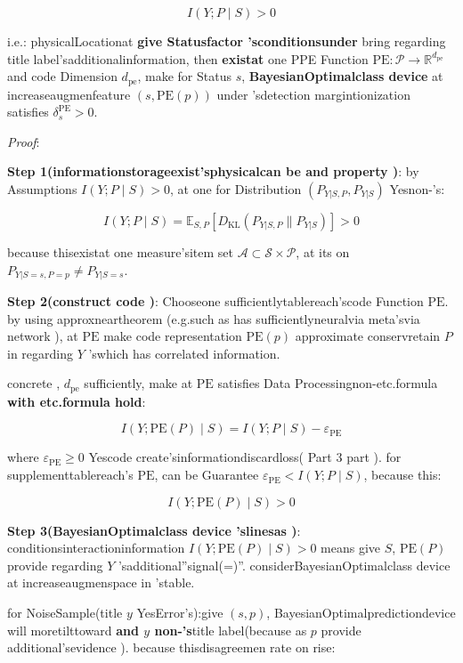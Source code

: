 \documentclass[
  12pt,
]{article}
\begin{document}
\[\boxed{I(Y; P \mid S) > 0}\]

i.e.: physicalLocationat \textbf{give Statusfactor 'sconditionsunder }bring regarding title label'sadditionalinformation, then \textbf{existat }one 
PPE Function \(\text{PE}: \mathcal{P} \to \mathbb{R}^{d_{\text{pe}}}\)
and code Dimension \(d_{\text{pe}}\), make for Status
\(s\), \textbf{BayesianOptimalclass device }at increaseaugmenfeature \((s, \text{PE}(p))\)
under 'sdetection margintionization satisfies  \(\delta_s^{\text{PE}} > 0\). 

\emph{Proof}: 

\textbf{Step 1(informationstorageexist'sphysicalcan be and property )}: by Assumptions
\(I(Y; P \mid S) > 0\), at one for Distribution \((P_{Y|S,P}, P_{Y|S})\)
Yesnon-'s: 

\[I(Y; P \mid S) = \mathbb{E}_{S, P}\left[D_{\text{KL}}(P_{Y|S,P} \| P_{Y|S})\right] > 0\]

because thisexistat one  measure'sitem set 
\(\mathcal{A} \subset \mathcal{S} \times \mathcal{P}\), at its on 
\(P_{Y|S=s, P=p} \neq P_{Y|S=s}\). 

\textbf{Step 2(construct code )}: Chooseone sufficientlytablereach'scode Function
\(\text{PE}\). by using approxneartheorem (e.g.such as has sufficientlyneuralvia meta'svia network ), at 
\(\text{PE}\) make code representation \(\text{PE}(p)\) approximate conservretain \(P\) in regarding 
\(Y\) 'swhich has correlated information. 

concrete ,  \(d_{\text{pe}}\) sufficiently, make at  \(\text{PE}\)
satisfies Data Processingnon-etc.formula \textbf{with etc.formula hold}: 

\[I(Y; \text{PE}(P) \mid S) = I(Y; P \mid S) - \varepsilon_{\text{PE}}\]

where \(\varepsilon_{\text{PE}} \geq 0\) Yescode create'sinformationdiscardloss( Part 3
part ). for supplementtablereach's \(\text{PE}\), can be Guarantee
\(\varepsilon_{\text{PE}} < I(Y; P \mid S)\), because this: 

\[I(Y; \text{PE}(P) \mid S) > 0\]

\textbf{Step 3(BayesianOptimalclass device 'slinesas )}: conditionsinteractioninformation
\(I(Y; \text{PE}(P) \mid S) > 0\) means give  \(S\), \(\text{PE}(P)\)
provide regarding  \(Y\) 'sadditional''signal(=)''.  considerBayesianOptimalclass device at increaseaugmenspace in 'stable. 

for NoiseSample(title  \(y\) YesError's):give 
\((s, p)\), BayesianOptimalpredictiondevice will moretilttoward \textbf{and  \(y\)
non-'s}title label(because as  \(p\) provide additional'sevidence ). because thisdisagreemen rate on rise: 
\end{document}
